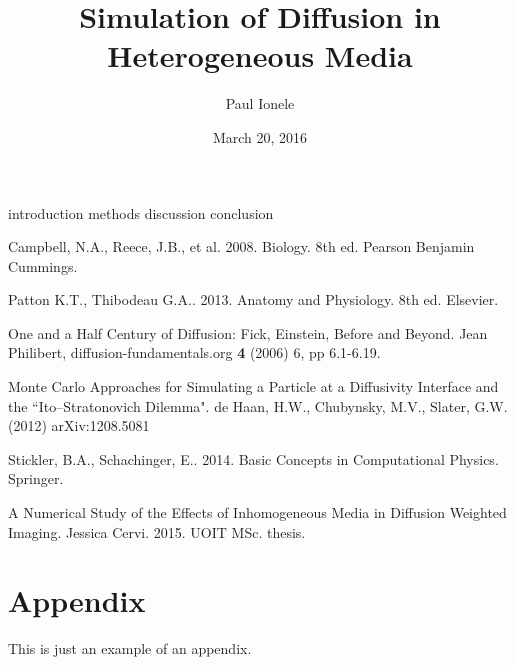 \documentclass{jthesis}
\title{Simulation of Diffusion in Heterogeneous Media}
\date{March 20, 2016}
\author{Paul Ionele}
\begin{document}
\maketitle



\makedeclaration

\maketableofcontents

\doublespacing

{introduction}
\newpage
{methods}
\newpage
{discussion}
\newpage
{conclusion}

\begin{thebibliography}{}

 Campbell, N.A., Reece, J.B., et al. 2008. Biology. 8th ed. Pearson Benjamin Cummings.

 Patton K.T., Thibodeau G.A.. 2013. Anatomy and Physiology. 8th ed. Elsevier.

 One and a Half Century of Diffusion: Fick, Einstein, Before and Beyond. Jean Philibert, diffusion-fundamentals.org \textbf{4} (2006) 6, pp 6.1-6.19.

 Monte Carlo Approaches for Simulating a Particle at a Diffusivity Interface and the ``Ito--Stratonovich Dilemma". de Haan, H.W., Chubynsky, M.V., Slater, G.W. (2012) arXiv:1208.5081

 Stickler, B.A., Schachinger, E.. 2014. Basic Concepts in Computational Physics. Springer.

 A Numerical Study of the Effects of Inhomogeneous Media in Diffusion Weighted Imaging. Jessica Cervi. 2015. UOIT MSc. thesis.

\end{thebibliography}

\appendix

\chapter{Appendix}
\label{app:sample}
This is just an example of an appendix.
\end{document}
